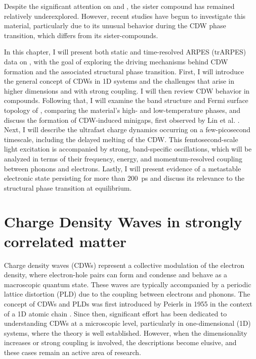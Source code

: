 Despite the significant attention on  and , the sister compound  has remained relatively underexplored.
However, recent studies have begun to investigate this material, particularly due to its unusual behavior during the CDW phase transition, which differs from its sister-compounds.

In this chapter, I will present both static and time-resolved ARPES (trARPES) data on , with the goal of exploring the driving mechanisms behind CDW formation and the associated structural phase transition.
First, I will introduce the general concept of CDWs in 1D systems and the challenges that arise in higher dimensions and with strong coupling.
I will then review CDW behavior in  compounds.
Following that, I will examine the band structure and Fermi surface topology of , comparing the material's high- and low-temperature phases, and discuss the formation of CDW-induced minigaps, first observed by Lin et al. \cite{lin_evidence_2022}.
Next, I will describe the ultrafast charge dynamics occurring on a few-picosecond timescale, including the delayed melting of the CDW.
This femtosecond-scale light excitation is accompanied by strong, band-specific oscillations, which will be analyzed in terms of their frequency, energy, and momentum-resolved coupling between phonons and electrons.
Lastly, I will present evidence of a metastable electronic state persisting for more than \qty{200}{\pico\second} and discuss its relevance to the structural phase transition at equilibrium.

\section{Charge Density Waves in strongly correlated matter}
\label{sec:cdw}

Charge density waves (CDWs) represent a collective modulation of the electron density, where electron-hole pairs can form and condense and behave as a macroscopic quantum state.
These waves are typically accompanied by a periodic lattice distortion (PLD) due to the coupling between electrons and phonons.
The concept of CDWs and PLDs was first introduced by Peierls in 1955 in the context of a 1D atomic chain \cite{peierls_quantum_1996}.
Since then, significant effort has been dedicated to understanding CDWs at a microscopic level, particularly in one-dimensional (1D) systems, where the theory is well established. However, when the dimensionality increases or strong coupling is involved, the descriptions become elusive, and these cases remain an active area of research.

